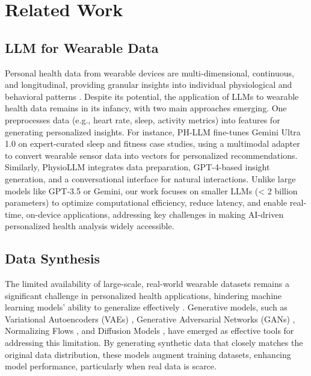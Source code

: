 \documentclass[preprint,12pt]{elsarticle}
\begin{document}
\section{Related Work}
\subsection{LLM for Wearable Data}
Personal health data from wearable devices are multi-dimensional, continuous, and longitudinal, providing granular insights into individual physiological and behavioral patterns \cite{merrill2024transforming}. Despite its potential, the application of LLMs to wearable health data remains in its infancy, with two main approaches emerging. One preprocesses data (e.g., heart rate, sleep, activity metrics) into features for generating personalized insights. For instance, PH-LLM \cite{cosentino2024towards} fine-tunes Gemini Ultra 1.0 on expert-curated sleep and fitness case studies, using a multimodal adapter to convert wearable sensor data into vectors for personalized recommendations. Similarly, PhysioLLM \cite{fang2024physioLLM} integrates data preparation, GPT-4-based insight generation, and a conversational interface for natural interactions. Unlike large models like GPT-3.5 or Gemini, our work focuses on smaller LLMs (< 2 billion parameters) to optimize computational efficiency, reduce latency, and enable real-time, on-device applications, addressing key challenges in making AI-driven personalized health analysis widely accessible.
\subsection{Data Synthesis}
The limited availability of large-scale, real-world wearable datasets remains a significant challenge in personalized health applications, hindering machine learning models' ability to generalize effectively \cite{merrill2024transforming}. Generative models, such as Variational Autoencoders (VAEs) \cite{kingma2013auto}, Generative Adversarial Networks (GANs) \cite{goodfellow2014generative}, Normalizing Flows \cite{rezende2015variational}, and Diffusion Models \cite{rombach2022high}, have emerged as effective tools for addressing this limitation. By generating synthetic data that closely matches the original data distribution, these models augment training datasets, enhancing model performance, particularly when real data is scarce.
\end{document}
